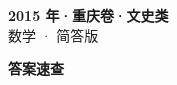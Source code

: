 \documentclass[zihao=-4, a4paper]{ctexart}
\begin{document}
\begin{center}
  {\Large\bfseries 2015 年·重庆卷·文史类}\\[4pt]
  {\large 数学 · 简答版}
\end{center}
\medskip
{}

\clearpage
{}
\begin{center}{\Large\bfseries 答案速查}\end{center}
\medskip

\end{document}
